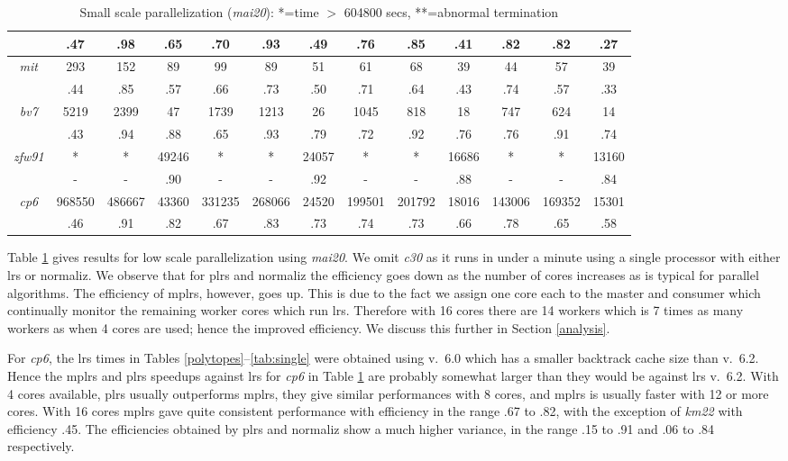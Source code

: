 \documentclass[a4paper,11pt]{article}   \usepackage{authblk} \usepackage[top=1.9cm,bottom=1.9cm,left=1.9cm,right=1.9cm]{geometry}
\newcommand{\progname}{\textsf}
\newcommand{\compname}{\emph}
\newcommand{\lrs}{\progname{lrs}\xspace}
\newcommand{\plrs}{\progname{plrs}\xspace}
\newcommand{\mplrs}{\progname{mplrs}\xspace}
\newcommand{\norm}{\progname{normaliz}\xspace}
\newcommand{\mait}{\compname{mai20}\xspace}
\newcommand{\polytope}{\emph}
\newcommand{\bvseven}{\polytope{bv7}\xspace}
\newcommand{\cthirty}{\polytope{c30}\xspace}
\newcommand{\mitine}{\polytope{mit}\xspace}
\newcommand{\cpsix}{\polytope{cp6}\xspace}
\newcommand{\kmtwo}{\polytope{km22}\xspace}
\newcommand{\zfw}{\polytope{zfw91}\xspace}
\begin{document}
\begin{table}[h!]
{\begin{tabular}[ht]{|c||c|c|c||c|c|c||c|c|c||c|c|c|}
          & .47 & .98  &  .65  &  .70  & .93  &  .49 &  .76  & .85  &  .41  &  .82  &  .82  & .27  \\
  \hline
\mitine   & 293 &  152 &  89   &   99  &  89  &  51  &   61  &  68  &   39  &  44   &   57  &  39  \\
          & .44 & .85  &  .57  &  .66  &  .73 & .50  &  .71  & .64  &  .43  &  .74  &  .57  & .33  \\
  \hline
\bvseven  &5219 & 2399 &  47   &  1739 & 1213 &  26  & 1045  &  818 &  18   &  747  &  624  &  14  \\
          & .43 & .94  & .88   &  .65  &  .93 & .79  &  .72  &  .92 & .76   & .76   & .91   & .74  \\
  \hline
\zfw      &  *  &  *   & 49246 &   *   &   *  &24057 &   *   &   *  & 16686 &   *   &   *   & 13160\\
          &  -  &  -   &  .90  &   -   &   -  & .92  &   -   &   -  & .88   &   -   &   -   & .84  \\
\hline
\cpsix   &968550&486667& 43360 &331235 &268066&24520 &199501 &201792& 18016 &143006 &169352 & 15301\\
         & .46  &  .91 &  .82  &  .67  &  .83 & .73  &  .74  &  .73 &  .66  & .78   & .65   & .58  \\
\hline
\end{tabular}
}
\caption{Small scale parallelization (\mait):  *=time $>$ 604800 secs, **=abnormal termination}
\label{tab:su12}
\end{table}

Table \ref{tab:su12} gives results for low scale parallelization
using \mait. We omit \cthirty as it runs in under a minute
using a single processor with either \lrs or \norm.
We observe that for \plrs and \norm the efficiency goes down as the number of cores
increases as is typical for parallel algorithms. The efficiency of \mplrs, however, 
goes up.
This is due to the fact we assign one core each to the master and consumer which 
continually
monitor the remaining worker cores which run \lrs. Therefore with 16 cores there are
14 workers which is 7 times as many workers as when 4 cores are used; hence
the improved efficiency. We discuss this further in Section \ref{analysis}.

For \cpsix, the \lrs times in Tables \ref{polytopes}--\ref{tab:single}
were obtained using v.\ 6.0 which has a smaller backtrack cache size than v.\ 6.2.
Hence the \mplrs and \plrs speedups against \lrs for \cpsix
in Table \ref{tab:su12} are probably somewhat larger than they would be against \lrs v.\ 6.2.
With 4 cores available, \plrs
usually outperforms \mplrs, they give similar performances with 8 cores,
and \mplrs
is usually faster with 12 or more cores.
With 16 cores \mplrs gave quite consistent performance with efficiency in the range .67 to .82,
with the exception of \kmtwo with efficiency .45.
The efficiencies obtained by
\plrs and \norm show a much higher variance, in the range .15 to .91 and .06 to .84
respectively.
\end{document}
